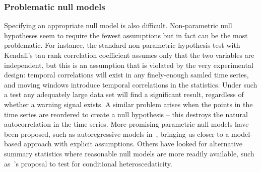 \documentclass[authoryear,review,11pt]{elsarticle}
\begin{document}
\subsubsection*{Problematic null models}
Specifying an appropriate null model is also difficult.  
Non-parametric null hypotheses seem to require the fewest assumptions but in fact can be the most problematic.  
For instance, the standard non-parametric hypothesis test with Kendall's tau rank correlation coefficient
assumes only that the two variables are independent,
but this is an assumption that is violated by the very experimental design:
temporal correlations will exist in any finely-enough samled time series, 
and moving windows introduce temporal correlations in the statistics.
Under such a test any adequately large data set will find a significant result,
regardless of whether a warning signal exists.
A similar problem arises when the points in the time series are reordered to create a null hypothesis -- 
this destroys the natural autocorrelation in the time series.  
More promising parametric null models have been proposed, 
such as autoregressive models in~\citet{Dakos2008}, bringing us  
closer to a model-based approach with explicit assumptions.  
Others have looked for alternative summary statistics where 
reasonable null models are more readily available, 
such as~\citet{Seekell2011}'s proposal to test for conditional heteroscedaticity.


%
\end{document}
